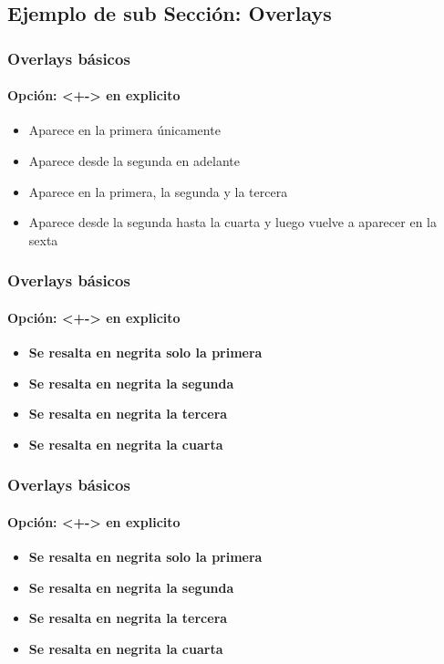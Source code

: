 \documentclass{beamer}
\begin{document}

  \subsection{Ejemplo de sub Sección: Overlays} %
  \begin{frame}
    \frametitle{Overlays básicos} %
    \framesubtitle{Opción: <+-> en explicito}
    \begin{itemize}
      \item<1> Aparece en la primera únicamente
      \item<2-> Aparece desde la segunda en adelante
      \item<-3> Aparece en la primera, la segunda y la tercera
      \item<2-4,6> Aparece desde la segunda hasta la cuarta y luego vuelve a aparecer en la sexta
    \end{itemize}
  \end{frame}


  \begin{frame}
    \frametitle{Overlays básicos} %
    \framesubtitle{Opción: <+-> en explicito}
    \begin{itemize}
      \item \textbf<1> {Se resalta en negrita solo la primera}
      \item \textbf<2> {Se resalta en negrita la segunda}
      \item \textbf<3> {Se resalta en negrita la tercera} 
      \item \textbf<4> {Se resalta en negrita la cuarta}
    \end{itemize}
  \end{frame}


  \begin{frame}
    \frametitle{Overlays básicos} %
    \framesubtitle{Opción: <+-> en explicito}
    \begin{itemize}
      \item<1-> \textbf<1> {Se resalta en negrita solo la primera}
      \item<2-> \textbf<2> {Se resalta en negrita la segunda}
      \item<3-> \textbf<3> {Se resalta en negrita la tercera} 
      \item<4-> \textbf<4> {Se resalta en negrita la cuarta}
    \end{itemize}
  \end{frame}
\end{document}
